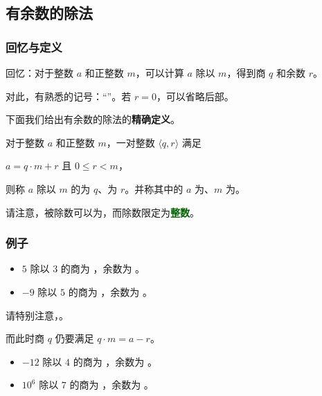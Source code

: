 \subsection{有余数的除法}
\begin{frame}[c]
  \progressnow*
\end{frame}
\begin{frame}
  \frametitle{回忆与定义}
  回忆：对于整数 $a$ 和正整数 $m$，可以计算 $a$ 除以 $m$，得到商 $q$ 和余数 $r$。
  
  对此，有熟悉的记号：“”。若 $r = 0$，可以省略后部。
  
  \emptyline
  下面我们给出有余数的除法的\textbf{精确定义}。
  \pause
  \begin{definition}[有余数的除法]
    对于整数 $a$ 和正整数 $m$，一对整数 $\langle q, r \rangle$ 满足
    \begin{center}
      $a = q \cdot m + r$ 且 $0 \le r < m$，
    \end{center}
    \pause
    则称 $a$ 除以 $m$ 的为 $q$、为 $r$。并称其中的 $a$ 为、$m$ 为。
  \end{definition}
  \pause
  请注意，被除数可以为，而除数限定为\textcolor{darkgreen}{\textbf{整数}}。
\end{frame}
\begin{frame}
  \frametitle{例子}
  \begin{itemize}
    \item $5$ 除以 $3$ 的商为 ，余数为 。
    \pause
    \pause
    \item $-9$ 除以 $5$ 的商为 ，余数为 。
  \end{itemize}
  \pause
  \pause
  请特别注意，。
  
  而此时商 $q$ 仍要满足 $q \cdot m = a - r$。
  \pause
  \begin{itemize}
    \item $-12$ 除以 $4$ 的商为 ，余数为 。
    \pause
    \pause
    \item ${10}^6$ 除以 $7$ 的商为 ，余数为 。
  \end{itemize}
\end{frame}
